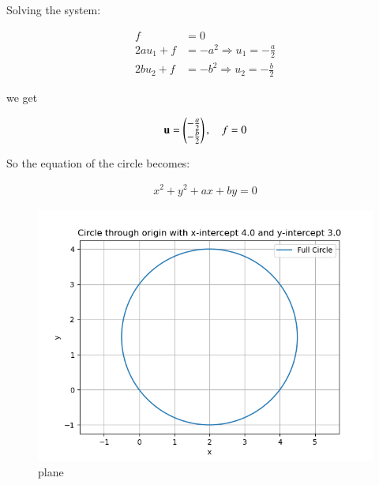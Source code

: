 \documentclass[journal]{IEEEtran}
\begin{document}
Solving the system:

\begin{align*}
f &= 0 \\
2a u_1 + f &= -a^2 \Rightarrow u_1 = -\frac{a}{2} \\
2b u_2 + f &= -b^2 \Rightarrow u_2 = -\frac{b}{2}
\end{align*}

we get

\begin{align}
\mathbf{u} = \begin{pmatrix} -\frac{a}{2} \\ -\frac{b}{2} \end{pmatrix}, \quad f = 0
\end{align}


So the equation of the circle becomes:


\begin{align}
x^2 + y^2 + ax + by = 0
\end{align}
\newpage
\begin{figure}[H]
\centering
\includegraphics[width=0.7\columnwidth]{figs/fig.png} 
\caption{plane}
\label{}
\end{figure}
\end{document}
